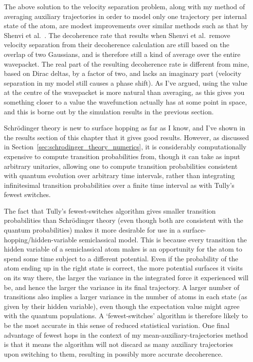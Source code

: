 The above solution to the velocity separation problem, along with my method of averaging auxiliary trajectories in order to model only one trajectory per internal state of the atom, are modest improvements over similar methods such as that by Shenvi et al.~\cite{doi:10.1063/1.3575588}. The decoherence rate that results when Shenvi et al.~remove velocity separation from their decoherence calculation are still based on the overlap of two Gaussians, and is therefore still a kind of average over the entire wavepacket. The real part of the resulting decoherence rate is different from mine, based on Dirac deltas, by a factor of two, and lacks an imaginary part (velocity separation in my model still causes a phase shift). As I've argued, using the value at the centre of the wavepacket is more natural than averaging, as this gives you something closer to a value the wavefunction actually has at some point in space, and this is borne out by the simulation results in the previous section.

Schr\"odinger theory is new to surface hopping as far as I know, and I've shown in the results section of this chapter that it gives good results. However, as discussed in Section~\ref{sec:schrodinger_theory_numerics}, it is considerably computationally expensive to compute transition probabilities from, though it can take as input arbitrary unitaries, allowing one to compute transition probabilities consistent with quantum evolution over arbitrary time intervals, rather than integrating infinitesimal transition probabilities over a finite time interval as with Tully's fewest switches. 

The fact that Tully's fewest-switches algorithm gives smaller transition probabilities than Schr\"odinger theory (even though both are consistent with the quantum probabilities) makes it more desirable for use in a surface-hopping/hidden-variable semiclassical model. This is because every transition the hidden variable of a semiclassical atom makes is an opportunity for the atom to spend some time subject to a different potential. Even if the probability of the atom ending up in the right state is correct, the more potential surfaces it visits on its way there, the larger the variance in the integrated force it experienced will be, and hence the larger the variance in its final trajectory. A larger number of transitions also implies a larger variance in the number of atoms in each state (as given by their hidden variable), even though the expectation value might agree with the quantum populations. A `fewest-switches' algorithm is therefore likely to be the most accurate in this sense of reduced statistical variation. One final advantage of fewest hops in the context of my mean-auxiliary-trajectories method is that it means the algorithm will not discard as many auxiliary trajectories upon switching to them, resulting in possibly more accurate decoherence.

